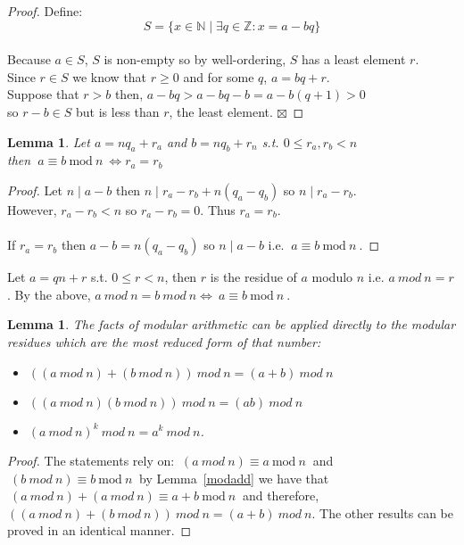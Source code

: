 \documentclass[12pt]{extarticle}
\renewcommand\qedsymbol{$\square$}
\newcommand{\cont}{$\boxtimes$}
\newcommand{\divides}{\mid}
\newcommand{\Z}{\mathbb{Z}}
\newcommand{\N}{\mathbb{N}}
\newtheorem{lemma}[theorem]{Lemma}
\newenvironment{definition}[1][Definition:]{\begin{trivlist}
\item[\hskip \labelsep {\bfseries #1}]}{\end{trivlist}}
\newenvironment{lproof}{\begin{proof} \renewcommand{\qedsymbol}{}}{\end{proof}}
\renewcommand{\mod}[3]{\: #1 \equiv #2 \: \mathrm{mod} \: #3 \:}
\begin{document}
\begin{proof}
Define: \[S = \{x \in \N \mid \exists q \in \Z : x = a - bq\}\] \\
Because $a \in S$, $S$ is non-empty so by well-ordering, $S$ has a least element $r$. \\ Since $r \in S$ we know that $r \ge 0$ and for some $q$, $a = bq + r$.\\
Suppose that $r > b$ then, $a- bq > a - bq - b = a-b(q+1) > 0$ \\
so $r - b \in S$ but is less than $r$, the least element. \cont     
\end{proof}

\begin{lemma}
Let $a = nq_a + r_a$ and $b = nq_b+r_n$ s.t. $0\le r_a,r_b < n$\\ then $\mod{a}{b}{n} \iff r_a = r_b$
\end{lemma}

\begin{lproof}
Let $n \divides a-b$ then $n \divides r_a - r_b + n(q_a-q_b)$ so $n \divides r_a-r_b$. \\
However, $r_a - r_b < n$ so $r_a - r_b = 0$. Thus $r_a = r_b$.
\\\\
If $r_a = r_b$ then $a-b = n(q_a-q_b)$ so $n \divides a-b$ i.e. $\mod{a}{b}{n}$. 
\end{lproof}

\begin{definition}
Let $a = qn + r$ s.t. $0 \le r < n$, then $r$ is the residue of $a$ modulo $n$ i.e. $a \: mod \: n = r$. By the above, $a \: mod \: n = b \: mod \: n \iff \mod{a}{b}{n}$.
\end{definition}


\begin{lemma}
The facts of modular arithmetic can be applied directly to the modular residues which are the most reduced form of that number:
\begin{itemize}
\item $((a \: mod \: n) + (b \: mod \: n)) \: mod \: n = (a + b) \: mod \: n$
\item $((a \: mod \: n)   (b \: mod \: n)) \: mod \: n = (a   b) \: mod \: n$
\item $(a \: mod \: n)^k \: mod \: n = a^k \: mod \: n$.
\end{itemize}
\end{lemma}

\begin{lproof}
The statements rely on: $\mod{(a \: mod \: n)}{a}{n}$ and $\mod{(b \: mod \: n)}{b}{n}$ by Lemma~\ref{modadd} we have that $\mod{(a \: mod \: n) + (a \: mod \: n)}{a+b}{n}$ and therefore, $((a \: mod \: n) + (b \: mod \: n)) \: mod \: n = (a + b) \: mod \: n$. The other results can be proved in an identical manner.
\end{lproof}
\end{document}
